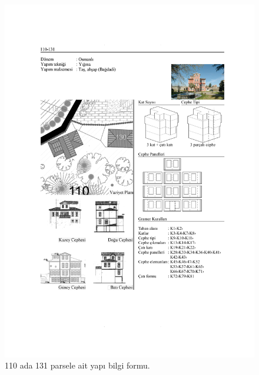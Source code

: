\begin{figure}
\centering
\includegraphics[width=1\textwidth,height=\textheight]{source/figures/BilgiFormlari/110-131.pdf}
\caption{110 ada 131 parsele ait yapı bilgi formu.}
\end{figure}

